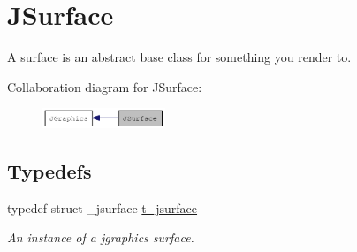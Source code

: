\hypertarget{group__jsurface}{
\section{JSurface}
\label{group__jsurface}
}


A surface is an abstract base class for something you render to.  


Collaboration diagram for JSurface:\nopagebreak
\begin{figure}[H]
\begin{center}
\leavevmode
\includegraphics[width=104pt]{group__jsurface}
\end{center}
\end{figure}
\subsection*{Typedefs}
\begin{DoxyCompactItemize}
\item 
\hypertarget{group__jsurface_ga9ced037ee8d6676fcd561e1d3420c28b}{
typedef struct \_\-jsurface \hyperlink{group__jsurface_ga9ced037ee8d6676fcd561e1d3420c28b}{t\_\-jsurface}}
\label{group__jsurface_ga9ced037ee8d6676fcd561e1d3420c28b}

\begin{DoxyCompactList}\small\item\em An instance of a jgraphics surface. \item\end{DoxyCompactList}\end{DoxyCompactItemize}
